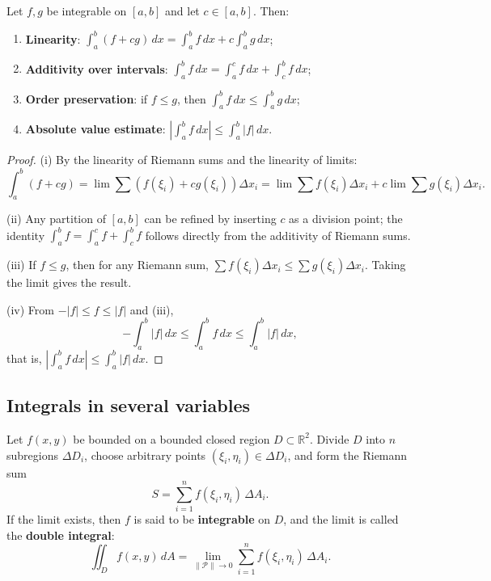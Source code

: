 \begin{property}\label{prop:integral_properties}
Let $f, g$ be integrable on $[a,b]$ and let $c \in [a,b]$. Then:
\begin{enumerate}[label=(\roman*)]
    \item \textbf{Linearity}: $\int_a^b (f + cg)\,dx = \int_a^b f\,dx + c\int_a^b g\,dx$;
    \item \textbf{Additivity over intervals}: $\int_a^b f\,dx = \int_a^c f\,dx + \int_c^b f\,dx$;
    \item \textbf{Order preservation}: if $f \le g$, then $\int_a^b f\,dx \le \int_a^b g\,dx$;
    \item \textbf{Absolute value estimate}: $\left|\int_a^b f\,dx\right| \le \int_a^b |f|\,dx$.
\end{enumerate}
\end{property}

\begin{proof}
(i) By the linearity of Riemann sums and the linearity of limits:
\[
\int_a^b (f+cg) = \lim \sum (f(\xi_i) + cg(\xi_i))\Delta x_i = \lim \sum f(\xi_i)\Delta x_i + c\lim \sum g(\xi_i)\Delta x_i.
\]

(ii) Any partition of $[a,b]$ can be refined by inserting $c$ as a division point; the identity $\int_a^b f = \int_a^c f + \int_c^b f$ follows directly from the additivity of Riemann sums.

(iii) If $f \le g$, then for any Riemann sum, $\sum f(\xi_i)\Delta x_i \le \sum g(\xi_i)\Delta x_i$. Taking the limit gives the result.

(iv) From $-|f| \le f \le |f|$ and (iii),
\[
-\int_a^b |f|\,dx \le \int_a^b f\,dx \le \int_a^b |f|\,dx,
\]
that is, $\left|\int_a^b f\,dx\right| \le \int_a^b |f|\,dx$.
\end{proof}

\subsection{\texorpdfstring{Integrals in several variables}{Integrals in several variables}}

\begin{definition}\label{def:double_integral}
Let $f(x,y)$ be bounded on a bounded closed region $D \subset \mathbb{R}^2$. Divide $D$ into $n$ subregions $\Delta D_i$, choose arbitrary points $(\xi_i, \eta_i) \in \Delta D_i$, and form the Riemann sum
\[S = \sum_{i=1}^n f(\xi_i, \eta_i)\,\Delta A_i.\]
If the limit exists, then $f$ is said to be \textbf{integrable} on $D$, and the limit is called the \textbf{double integral}:
\[\iint_D f(x,y)\,dA = \lim_{\|\mathcal{P}\| \to 0} \sum_{i=1}^n f(\xi_i, \eta_i)\,\Delta A_i.\]
\end{definition}

